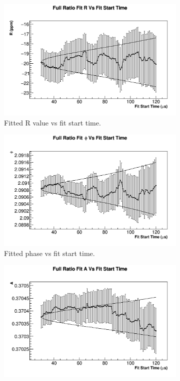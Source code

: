 	\begin{figure}[]
	\centering
	    \begin{subfigure}[t]{0.45\textwidth}
		    \centering
			\includegraphics[width=\textwidth]{RatioCBO_R_FS_Canv}
		    \caption{Fitted R value vs fit start time.}
	    \end{subfigure}
	    \begin{subfigure}[t]{0.45\textwidth}
		    \centering
			\includegraphics[width=\textwidth]{RatioCBO_phi_FS_Canv}
		    \caption{Fitted \gmtwo phase vs fit start time.}
	    \end{subfigure}%
	    \vspace{4mm}
	    \begin{subfigure}[t]{0.45\textwidth}
		    \centering
			\includegraphics[width=\textwidth]{RatioCBO_A_FS_Canv}

\end{subfigure}
\end{figure}
